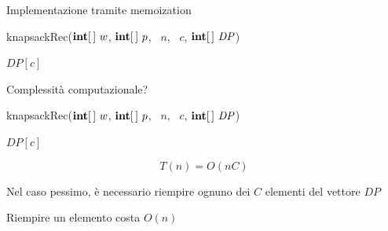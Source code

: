 \begin{frame}{Implementazione tramite memoization}

\vspace{-9pt}
\begin{Procedure}
\caption[A]{\textsf{knapsackRec}($\INTEGER[\,]\ w$, $\INTEGER[\,]\ p$, \INTEGER\ $n$, \INTEGER\ $c$, $\INTEGER[\,]\ \mathit{DP}$)}
\Return $\mathit{DP}[c]$\;
\end{Procedure}
\end{frame}

\begin{frame}{Complessità computazionale?}

\vspace{-6pt}

\begin{overprint}
\begin{Procedure}
\caption[A]{\textsf{knapsackRec}($\INTEGER[\,]\ w$, $\INTEGER[\,]\ p$, \INTEGER\ $n$, \INTEGER\ $c$, $\INTEGER[\,]\ \mathit{DP}$)}
\Return $\mathit{DP}[c]$\;
\end{Procedure}

\bigskip
\[ 
  T(n) = O(nC)
\]

\BIL
\item Nel caso pessimo, è necessario riempire ognuno dei $C$ elementi del vettore $\mathit{DP}$
\item Riempire un elemento costa $O(n)$
\EIL

\end{overprint}

\end{frame}


